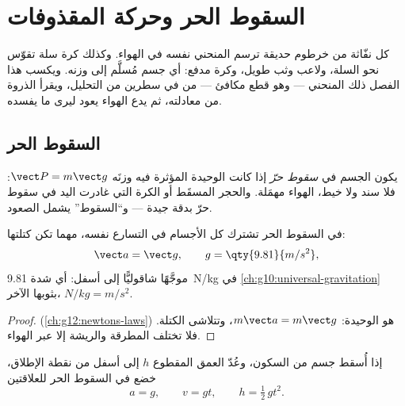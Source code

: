 \chapter{السقوط الحر وحركة المقذوفات}\label{ch:g12:projectile-motion}

كل نفّاثة من خرطوم حديقة ترسم المنحني نفسه في الهواء. وكذلك
كرة سلة تقوّس نحو السلة، ولاعب وثب طويل، وكرة مدفع: أي جسم
مُسلَّم إلى وزنه. ويكسب هذا الفصل ذلك المنحني --- وهو قطع مكافئ ---
من  في سطرين من التحليل، ويقرأ الذروة   من معادلته، ثم يدع الهواء يعود ليرى ما
يفسده.

\section{السقوط الحر}

\begin{definition}\label{def:g12:projectile-motion:freefall}
يكون الجسم في \emph{سقوط حرّ} إذا كانت  الوحيدة المؤثرة
فيه وزنَه $\vect P = m\vect g$: فلا سند ولا خيط،  الهواء
مهمَلة. والحجر المسقَط أو الكرة التي غادرت اليد في سقوط حرّ بدقة
جيدة --- و``السقوط'' يشمل الصعود.
\end{definition}

\begin{theorem}\label{thm:g12:projectile-motion:galileo}
في السقوط الحر تشترك كل الأجسام في التسارع نفسه، مهما تكن كتلتها:
\[
\vect a = \vect g, \qquad g = \qty{9.81}{m/s^2},
\]
موجَّهًا شاقوليًّا إلى أسفل: أي شدة  \qty{9.81}{N/kg} في
\cref{ch:g10:universal-gravitation} بثوبها الآخر، $\unit{N/kg} = \unit{m/s^2}$.
\end{theorem}

\begin{proof}
 (\cref{ch:g12:newtons-laws})  هو 
الوحيدة: $m\vect a = m\vect g$، وتتلاشى الكتلة. فلا تختلف المطرقة
والريشة إلا عبر الهواء.
\end{proof}

\begin{proposition}\label{prop:g12:projectile-motion:vertical}
إذا أُسقط جسم من السكون، وعُدّ العمق المقطوع $h$ إلى أسفل من
نقطة الإطلاق، خضع في السقوط الحر للعلاقتين
\[
a = g, \qquad v = g t, \qquad h = \tfrac12\, g t^2 .
\]
\end{proposition}

